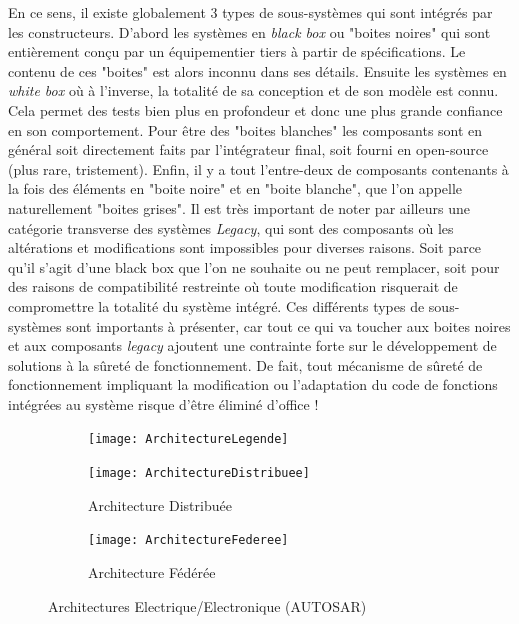 \documentclass[french, a4paper, 11pt, twoside, pdftex]{StyleThese}
\begin{document}
	En ce sens, il existe globalement 3 types de sous-systèmes qui sont intégrés par les constructeurs. 
	D'abord les systèmes en \textit{black box} ou "boites noires" qui sont entièrement conçu par un équipementier tiers à partir de spécifications. Le contenu de ces "boites" est alors inconnu dans ses détails.
	Ensuite les systèmes en \textit{white box} où à l'inverse, la totalité de sa conception et de son modèle est connu. Cela permet des tests bien plus en profondeur et donc une plus grande confiance en son comportement. Pour être des "boites blanches" les composants sont en général soit directement faits par l'intégrateur final, soit fourni en open-source (plus rare, tristement).
	Enfin, il y a tout l'entre-deux de composants contenants à la fois des éléments en "boite noire" et en "boite blanche", que l'on appelle naturellement "boites grises".
	Il est très important de noter par ailleurs une catégorie transverse des systèmes \textit{Legacy}, qui sont des composants où les altérations et modifications sont impossibles pour diverses raisons. Soit parce qu'il s'agit d'une black box que l'on ne souhaite ou ne peut remplacer, soit pour des raisons de compatibilité restreinte où toute modification risquerait de compromettre la totalité du système intégré. 
	Ces différents types de sous-systèmes sont importants à présenter, car tout ce qui va toucher aux boites noires et aux composants \textit{legacy} ajoutent une contrainte forte sur le développement de solutions à la sûreté de fonctionnement. De fait, tout mécanisme de sûreté de fonctionnement impliquant la modification ou l'adaptation du code de fonctions intégrées au système risque d'être éliminé d'office !
	
		\begin{figure}[h!]
		\centering
		\begin{subfigure}{\textwidth} \centering
			\texttt{[image: ArchitectureLegende]}
		\end{subfigure}
		\newline
		\begin{subfigure}{0.5\textwidth} \centering
			\texttt{[image: ArchitectureDistribuee]}
			\caption{Architecture Distribuée}
			\label{fig:ArchiDistrib}
		\end{subfigure}
		\begin{subfigure}{0.45\textwidth} \centering
			\texttt{[image: ArchitectureFederee]}
			\caption{Architecture Fédérée}
			\label{fig:ArchiFederee}
		\end{subfigure}
		\caption{Architectures Electrique/Electronique (AUTOSAR)}
		\label{fig:ArchitecturesEE}
	\end{figure}
\end{document}
